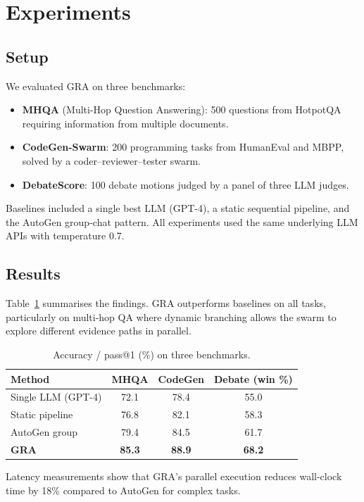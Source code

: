 \documentclass[11pt]{article}
\begin{document}
\section{Experiments}
\subsection{Setup}
We evaluated GRA on three benchmarks:
\begin{itemize}
    \item \textbf{MHQA} (Multi-Hop Question Answering): 500 questions from HotpotQA requiring information from multiple documents.
    \item \textbf{CodeGen-Swarm}: 200 programming tasks from HumanEval and MBPP, solved by a coder–reviewer–tester swarm.
    \item \textbf{DebateScore}: 100 debate motions judged by a panel of three LLM judges.
\end{itemize}
Baselines included a single best LLM (GPT-4), a static sequential pipeline, and the AutoGen group-chat pattern. 
All experiments used the same underlying LLM APIs with temperature 0.7.

\subsection{Results}
Table~\ref{tab:results} summarises the findings. 
GRA outperforms baselines on all tasks, particularly on multi-hop QA where dynamic branching allows the swarm to explore different evidence paths in parallel.

\begin{table}[htbp]
\centering
\caption{Accuracy / pass@1 (\%) on three benchmarks.}
\label{tab:results}
\begin{tabular}{lccc}
\toprule
\textbf{Method} & \textbf{MHQA} & \textbf{CodeGen} & \textbf{Debate (win \%)} \\
\midrule
Single LLM (GPT-4) & 72.1 & 78.4 & 55.0 \\
Static pipeline   & 76.8 & 82.1 & 58.3 \\
AutoGen group     & 79.4 & 84.5 & 61.7 \\
\textbf{GRA}      & \textbf{85.3} & \textbf{88.9} & \textbf{68.2} \\
\bottomrule
\end{tabular}
\end{table}

Latency measurements show that GRA’s parallel execution reduces wall-clock time by 18\% compared to AutoGen for complex tasks.
\end{document}
